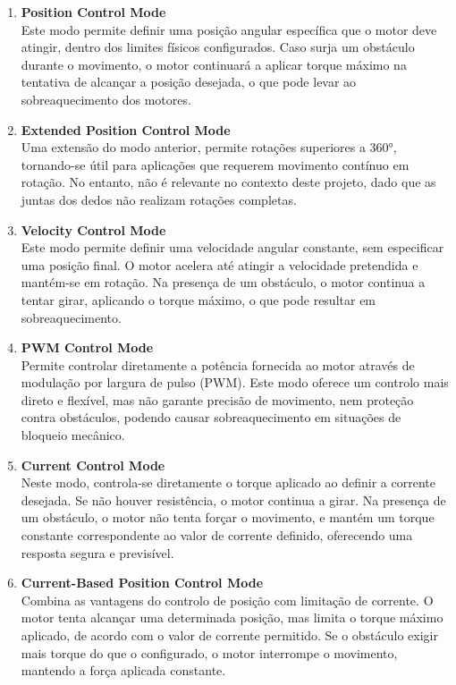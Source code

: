 \begin{enumerate}
    \item \textbf{Position Control Mode} \\
    Este modo permite definir uma posição angular específica que o motor deve atingir, dentro dos limites físicos configurados. Caso surja um obstáculo durante o movimento, o motor continuará a aplicar torque máximo na tentativa de alcançar a posição desejada, o que pode levar ao sobreaquecimento dos motores.


    \item \textbf{Extended Position Control Mode} \\
    Uma extensão do modo anterior, permite rotações superiores a 360°, tornando-se útil para aplicações que requerem movimento contínuo em rotação. No entanto, não é relevante no contexto deste projeto, dado que as juntas dos dedos não realizam rotações completas.


    \item \textbf{Velocity Control Mode} \\  
    Este modo permite definir uma velocidade angular constante, sem especificar uma posição final. O motor acelera até atingir a velocidade pretendida e mantém-se em rotação. Na presença de um obstáculo, o motor continua a tentar girar, aplicando o torque máximo, o que pode resultar em sobreaquecimento.


    \item \textbf{PWM Control Mode} \\
    Permite controlar diretamente a potência fornecida ao motor através de modulação por largura de pulso (PWM). Este modo oferece um controlo mais direto e flexível, mas não garante precisão de movimento, nem proteção contra obstáculos, podendo causar sobreaquecimento em situações de bloqueio mecânico.


    \item \textbf{Current Control Mode} \\
    Neste modo, controla-se diretamente o torque aplicado ao definir a corrente desejada. Se não houver resistência, o motor continua a girar. Na presença de um obstáculo, o motor não tenta forçar o movimento, e mantém um torque constante correspondente ao valor de corrente definido, oferecendo uma resposta segura e previsível.


    \item \textbf{Current-Based Position Control Mode} \\   
    Combina as vantagens do controlo de posição com limitação de corrente. O motor tenta alcançar uma determinada posição, mas limita o torque máximo aplicado, de acordo com o valor de corrente permitido. Se o obstáculo exigir mais torque do que o configurado, o motor interrompe o movimento, mantendo a força aplicada constante.

\end{enumerate}

